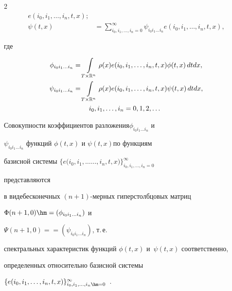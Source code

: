 \begin{multicols}{2}
\begin{align}
e(i_0,i_1,\dots,i_n,t,x);\! \label{eqPhiInvert}\\


  \psi(t,x) &= \!\!\!\sum\limits_{i_0,i_1,\dots,i_n = 0}^\infty\!\!\!


   \psi_{i_0 i_1 \dots i_n}  e(i_0,i_1,\dots,i_n,t,x),\!


   \label{eqPsiInvert}


\end{align}


где


\begin{align*}


\phi_{i_0 i_1 \dots i_n} &= \int\limits_{T \times \mathbb{R}^n} \rho(x) e(i_0,i_1,\dots,i_n,t,x) \phi(t,x)\, dt dx, \\


\psi_{i_0 i_1 \dots i_n} &= \int\limits_{T \times \mathbb{R}^n} \rho(x) e(i_0,i_1,\dots,i_n,t,x) \psi(t,x)\, dt dx, \\


&\hspace*{8mm}  i_0,i_1,\dots,i_n = 0,1,2,\dots


\end{align*}





Совокупности коэффициентов разложения\linebreak $\phi_{i_0 i_1 \dots i_n}$ и 


$\psi_{i_0 i_1 \dots i_n}$ функций $\phi(t,x)$ и $\psi(t,x)$\linebreak по функциям 


базисной сис\-те\-мы $\{e(i_0,i_1,\dots$\linebreak $\dots,i_n,t,x)\}_{i_0,i_1,\dots,i_n = 0}^\infty$ 


пред\-став\-ля\-ют\-ся 


в виде\linebreak бесконечных ${(n+1)}$-мер\-ных ги\-пер\-столб\-цо\-вых мат\-риц 


$\Phi(n+1,0) \hm= (\phi_{i_0 i_1 \dots i_n})$ и 


$\Psi(n+1,0) =$\linebreak $= (\psi_{i_0 i_1 \dots i_n})$, т.\,е.\ 


спектральных характеристик функций $\phi(t,x)$ и~$\psi(t,x)$ соответственно,\linebreak 


определенных относительно базисной сис\-те\-мы 


${\{e(i_0,i_1,\dots,i_n,t,x)\}_{i_0,i_1,\dots,i_n \hm= 0}^\infty}$~\cite{PanRybSot, PanRyb}. 



\end{multicols}
